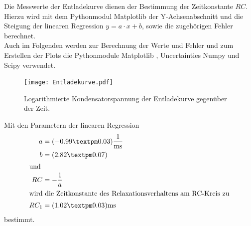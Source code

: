 \noindent Die Messwerte der Entladekurve dienen der Bestimmung der Zeitkonstante $RC$.  
Hierzu wird mit dem Pythonmodul Matplotlib \cite{matplotlib} der Y-Achsenabschnitt und die Steigung der linearen Regression $y = a \cdot x + b$, 
sowie die zugehörigen Fehler berechnet.\\
Auch im Folgenden werden zur Berechnung der Werte und Fehler und zum Erstellen der Plots die Pythonmodule Matplotlib \cite{matplotlib}, Uncertainties \cite{uncertainties}
Numpy \cite{numpy} und Scipy \cite{scipy} verwendet.
\begin{figure}[H]
  \centering
  \texttt{[image: Entladekurve.pdf]}
  \caption{Logarithmierte Kondensatorspannung der Entladekurve gegenüber der Zeit.}
  \label{fig:Entladekurve_plot}
\end{figure}
\noindent Mit den Parametern der linearen Regression
\begin{align*}
a &= (-0.99 ± 0.03)\si{\milli\second\tothe{-1}} \\
b &= (2.82 ± 0.07)\\
\shortintertext{und}
RC&= - \frac{1}{a}\\
\intertext{wird die Zeitkonstante des Relaxationsverhaltens am RC-Kreis zu}
RC_1&=(1.02 ± 0.03)\si{\milli\second}
\end{align*}
bestimmt.



